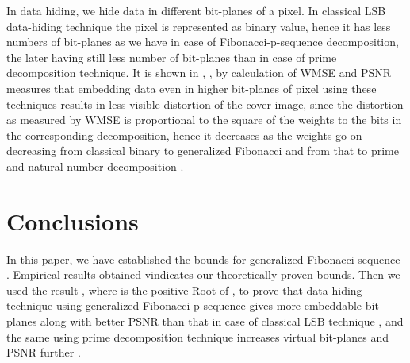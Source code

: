 \documentclass{ijcsa}
\begin{document}
\par In data hiding, we hide data in different bit-planes of a pixel. In classical LSB data-hiding technique the 
pixel is represented as binary value, hence it has less numbers of bit-planes as we have in case of Fibonacci-p-sequence 
decomposition, the later having still less number of bit-planes than in case of prime decomposition technique.
It is shown in \cite{dey07a}, \cite{dey07b}, \cite{dey08} by calculation of WMSE and PSNR measures that embedding data even 
in higher bit-planes of pixel using these techniques results in less visible distortion of the cover image, since the distortion
as measured by WMSE is proportional to the square of the weights to the bits in the corresponding decomposition, hence it decreases
as the weights go on decreasing from classical binary to generalized Fibonacci and from that to prime and natural number decomposition \cite{dey08}.

\section{Conclusions}
In this paper, we have established the bounds for generalized Fibonacci-sequence . Empirical results obtained vindicates our theoretically-proven bounds. Then we used the 
result , where 
 is the positive Root of , to prove that data hiding technique using generalized 
Fibonacci-p-sequence gives more embeddable bit-planes along with better PSNR than that in case of 
classical LSB technique \cite{dey08}, and the same using prime decomposition technique increases virtual bit-planes 
and PSNR further \cite{dey07a}. 
\end{document}
